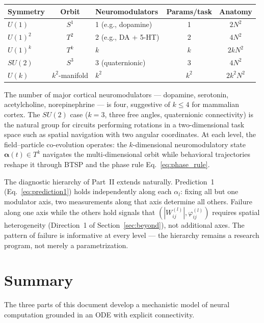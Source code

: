 \documentclass[11pt]{article}
\begin{document}
\begin{center}
\renewcommand{\arraystretch}{1.3}
\begin{tabular}{@{}lclcc@{}}
\toprule
\textbf{Symmetry} & \textbf{Orbit} &
  \textbf{Neuromodulators} & \textbf{Params/task} &
  \textbf{Anatomy} \\
\midrule
$U(1)$ & $S^1$ & 1 (e.g., dopamine) & 1 & $2N^2$ \\
$U(1)^2$ & $T^2$ & 2 (e.g., DA + 5-HT) & 2 & $4N^2$ \\
$U(1)^k$ & $T^k$ & $k$ & $k$ & $2kN^2$ \\
$SU(2)$ & $S^3$ & 3 (quaternionic) & 3 & $4N^2$ \\
$U(k)$ & $k^2$-manifold & $k^2$ & $k^2$ & $2k^2 N^2$ \\
\bottomrule
\end{tabular}
\end{center}

The number of major cortical neuromodulators --- dopamine,
serotonin, acetylcholine, norepinephrine --- is four, suggestive
of $k \leq 4$ for mammalian cortex. The $SU(2)$ case ($k=3$, three
free angles, quaternionic connectivity) is the natural group for
circuits performing rotations in a two-dimensional task space such
as spatial navigation with two angular coordinates. At each level,
the field--particle co-evolution operates: the $k$-dimensional
neuromodulatory state $\boldsymbol{\alpha}(t) \in T^k$ navigates
the multi-dimensional orbit while behavioral trajectories reshape
it through BTSP and the phase rule Eq.~\eqref{eq:phase_rule}.

The diagnostic hierarchy of Part~II extends naturally. Prediction~1
(Eq.~\eqref{eq:prediction1}) holds independently along each
$\alpha_l$: fixing all but one modulator axis, two measurements
along that axis determine all others. Failure along one axis
while the others hold signals that $(|W^{(l)}_{ij}|,
\varphi^{(l)}_{ij})$ requires spatial heterogeneity (Direction~1
of Section~\ref{sec:beyond}), not additional axes. The pattern
of failure is informative at every level --- the hierarchy
remains a research program, not merely a parametrization.

\section{Summary}

The three parts of this document develop a mechanistic model of
neural computation grounded in an ODE with explicit connectivity.
\end{document}
